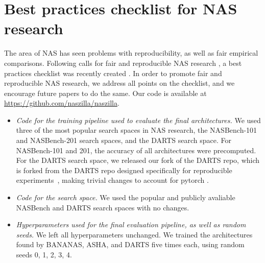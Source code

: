 \documentclass[11pt]{article}
\numberwithin{equation}{section}
\numberwithin{figure}{section}
\theoremstyle{plain}
\theoremstyle{definition}
\begin{document}
 \section{Best practices checklist for NAS research} \label{app:checklist}
The area of NAS has seen problems with reproducibility, 
as well as fair empirical comparisons.
Following calls for fair and reproducible NAS research \cite{randomnas, nasbench}, a best practices checklist was recently created \cite{lindauer2019best}.
In order to promote fair and reproducible NAS research, we address all points on the checklist, and we encourage future papers to do the same.
Our code is available at \url{https://github.com/naszilla/naszilla}.

\begin{itemize}
    \item \emph{Code for the training pipeline used to evaluate the final architectures.}
    We used three of the most popular search spaces in NAS research, the NASBench-101 and NASBench-201 search spaces, and the DARTS search space.
    For NASBench-101 and 201, the accuracy of all architectures were precomputed.
    For the DARTS search space, we released our fork of the DARTS repo, which is forked from the DARTS repo designed specifically for reproducible experiments~\cite{randomnas}, making trivial changes to account for pytorch .
    \item \emph{Code for the search space.}
    We used the popular and publicly avaliable NASBench and DARTS search spaces with no changes.
    \item \emph{Hyperparameters used for the final evaluation pipeline, as well as random seeds.}
    We left all hyperparameters unchanged.
    We trained the architectures found by BANANAS, ASHA, and DARTS five times each,
    using random seeds 0, 1, 2, 3, 4.


\end{itemize}
\end{document}
